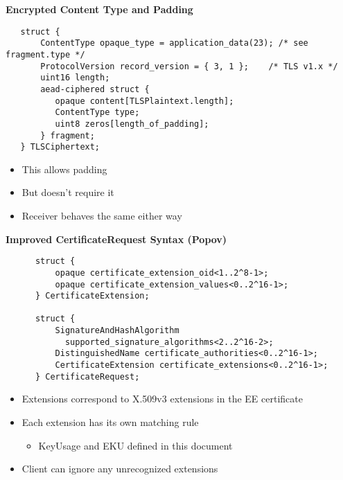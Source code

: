 \documentclass[helvetica]{seminar}
\newcommand{\heading}[1]{%
  \begin{center} 
    \large\bf 
    #1 
  \end{center} 
  \vspace{.4 in}}
\begin{document}
\begin{slide}
\heading{Encrypted Content Type and Padding}

\begin{footnotesize}
\begin{verbatim}
   struct {
       ContentType opaque_type = application_data(23); /* see fragment.type */
       ProtocolVersion record_version = { 3, 1 };    /* TLS v1.x */
       uint16 length;
       aead-ciphered struct {
          opaque content[TLSPlaintext.length];
          ContentType type;
          uint8 zeros[length_of_padding];
       } fragment;
   } TLSCiphertext;
\end{verbatim}
\end{footnotesize}

\begin{itemize}
\item This allows padding
\item But doesn't require it
\item Receiver behaves the same either way
\end{itemize}
\end{slide}


\begin{slide}
\heading{Improved CertificateRequest Syntax (Popov)}

\vspace{-3ex}
\begin{footnotesize}
\begin{verbatim}
      struct {
          opaque certificate_extension_oid<1..2^8-1>;
          opaque certificate_extension_values<0..2^16-1>;
      } CertificateExtension;

      struct {
          SignatureAndHashAlgorithm
            supported_signature_algorithms<2..2^16-2>;
          DistinguishedName certificate_authorities<0..2^16-1>;
          CertificateExtension certificate_extensions<0..2^16-1>;
      } CertificateRequest;
\end{verbatim}
\end{footnotesize}

\begin{itemize}
\item Extensions correspond to X.509v3 extensions in the EE certificate
\item Each extension has its own matching rule
  \begin{itemize}
  \item KeyUsage and EKU defined in this document
  \end{itemize}
\item Client can ignore any unrecognized extensions
\end{itemize}
\end{slide}
\end{document}
